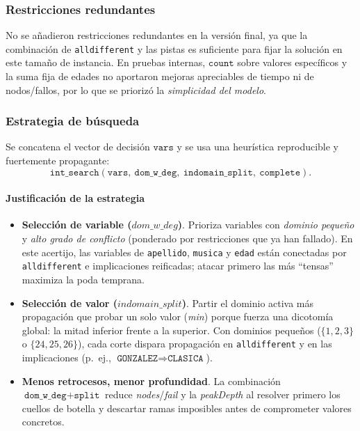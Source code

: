 \subsubsection*{Restricciones redundantes}
No se añadieron restricciones redundantes en la versión final, ya que la combinación de \texttt{alldifferent} y las pistas es suficiente para fijar la solución en este tamaño de instancia. En pruebas internas, \(\texttt{count}\) sobre valores específicos y la suma fija de edades no aportaron mejoras apreciables de tiempo ni de nodos/fallos, por lo que se priorizó la \emph{simplicidad del modelo}.

\subsubsection*{Estrategia de búsqueda}
Se concatena el vector de decisión \(\texttt{vars}\) y se usa una heurística reproducible y fuertemente propagante:
\[
\texttt{int\_search}(\texttt{vars},\ \texttt{dom\_w\_deg},\ \texttt{indomain\_split},\ \texttt{complete}).
\]
\paragraph{Justificación de la estrategia}
\begin{itemize}
  \item \textbf{Selección de variable (\(dom\_w\_deg\))}. Prioriza variables con \emph{dominio pequeño} y \emph{alto grado de conflicto} (ponderado por restricciones que ya han fallado). En este acertijo, las variables de \texttt{apellido}, \texttt{musica} y \texttt{edad} están conectadas por \texttt{alldifferent} e implicaciones reificadas; atacar primero las más “tensas” maximiza la poda temprana.
  \item \textbf{Selección de valor (\(indomain\_split\))}. Partir el dominio activa más propagación que probar un solo valor (\emph{min}) porque fuerza una dicotomía global: la mitad inferior frente a la superior. Con dominios pequeños (\(\{1,2,3\}\) o \(\{24,25,26\}\)), cada corte dispara propagación en \texttt{alldifferent} y en las implicaciones (p.~ej., \(\texttt{GONZALEZ}\Rightarrow\texttt{CLASICA}\)).
  \item \textbf{Menos retrocesos, menor profundidad}. La combinación \(\texttt{dom\_w\_deg}+\texttt{split}\) reduce \textit{nodes}/\textit{fail} y la \textit{peakDepth} al resolver primero los cuellos de botella y descartar ramas imposibles antes de comprometer valores concretos.
\end{itemize}
